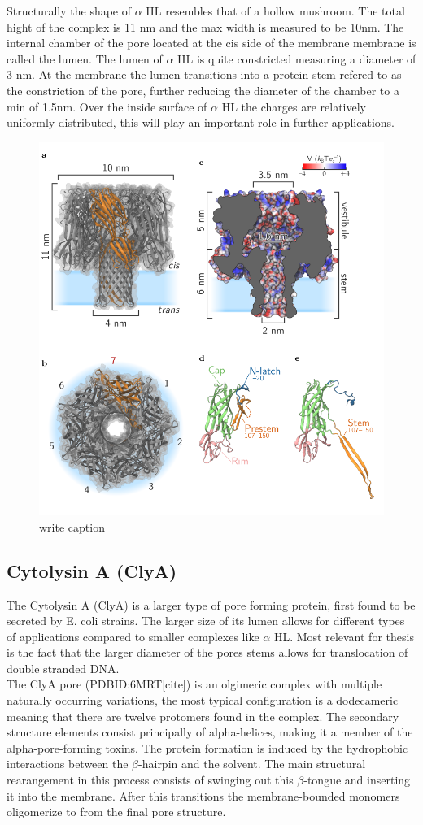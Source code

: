 Structurally the shape of $\alpha$ HL resembles that of a hollow mushroom. The total
hight of the complex is 11 nm and the max width is measured to be 10nm. The internal
chamber of the pore located at the cis side of the membrane membrane is called the lumen.
The lumen of $\alpha$ HL is quite constricted measuring a diameter of 3 nm. At the
membrane the lumen transitions into a protein stem refered to as the constriction of the
pore, further reducing the diameter of the chamber to a min of 1.5nm. Over the inside
surface of  $\alpha$ HL the charges are relatively uniformly distributed, this will play
an important role in further applications.\\


\begin{figure}[h!]
  \centering
  \includegraphics[width=0.5\linewidth]{Figures/alpha-hemolysin.png}
  \caption{write caption}
  \label{adsf}
\end{figure}


\subsection{Cytolysin A (ClyA)}

The Cytolysin A (ClyA) is a larger type of pore forming protein, first found to be
secreted by E. coli strains. The larger size of its lumen allows for different types of
applications compared to smaller complexes like $\alpha$ HL. Most relevant for thesis is
the fact that the larger diameter of the pores stems allows for translocation of double
stranded DNA.\\

The ClyA pore (PDBID:6MRT[cite]) is an olgimeric complex with multiple naturally
occurring variations, the most typical configuration is a dodecameric meaning that there
are twelve protomers found in the complex. The secondary structure elements consist
principally of alpha-helices, making it a member of the alpha-pore-forming toxins. The
protein formation is induced by the hydrophobic interactions between the $\beta$-hairpin
and the solvent. The main structural rearangement in this process consists of swinging
out this $\beta$-tongue and inserting it into the membrane. After this transitions the
membrane-bounded monomers oligomerize to from the final pore structure.

